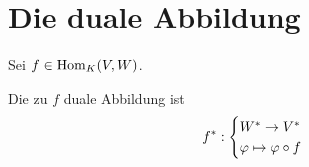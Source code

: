 \section{Die duale Abbildung}

Sei $f\in\Hom_K(V,W)$.

\begin{definition}
	Die zu $f$ duale Abbildung ist
	\begin{align}
		f^*:
		\begin{cases}
			W^*\to V^* \\
			\phi\mapsto \phi\circ f
		\end{cases} \notag
	\end{align}
\end{definition}